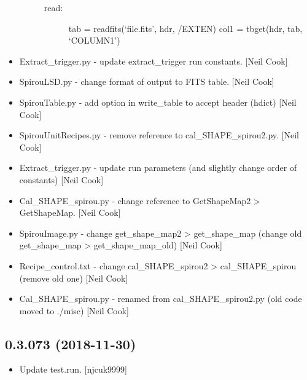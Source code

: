 \documentclass[a4paper,10pt,english]{report}
\begin{document}
\begin{itemize}
\begin{description}
\begin{description}
\item[{read:}] \leavevmode
tab = readfits(‘file.fits’, hdr, /EXTEN)
col1 = tbget(hdr, tab, ‘COLUMN1’)

\end{description}

\end{description}

\item {} 
Extract\_trigger.py - update extract\_trigger run constants. {[}Neil Cook{]}

\item {} 
SpirouLSD.py - change format of output to FITS table. {[}Neil Cook{]}

\item {} 
SpirouTable.py - add option in write\_table to accept header (hdict)
{[}Neil Cook{]}

\item {} 
SpirouUnitRecipes.py - remove reference to cal\_SHAPE\_spirou2.py. {[}Neil
Cook{]}

\item {} 
Extract\_trigger.py - update run parameters (and slightly change order
of constants) {[}Neil Cook{]}

\item {} 
Cal\_SHAPE\_spirou.py - change reference to GetShapeMap2 \textendash{}\textgreater{}
GetShapeMap. {[}Neil Cook{]}

\item {} 
SpirouImage.py - change get\_shape\_map2 \textendash{}\textgreater{} get\_shape\_map (change old
get\_shape\_map \textendash{}\textgreater{} get\_shape\_map\_old) {[}Neil Cook{]}

\item {} 
Recipe\_control.txt - change cal\_SHAPE\_spirou2 \textendash{}\textgreater{} cal\_SHAPE\_spirou
(remove old one) {[}Neil Cook{]}

\item {} 
Cal\_SHAPE\_spirou.py - renamed from cal\_SHAPE\_spirou2.py (old code
moved to ./misc) {[}Neil Cook{]}

\end{itemize}


\subsection{0.3.073 (2018-11-30)}
\label{\detokenize{misc/changelog:id248}}\begin{itemize}
\item {} 
Update test.run. {[}njcuk9999{]}

\end{itemize}
\end{document}
